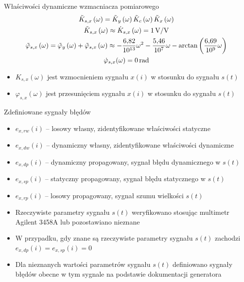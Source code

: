 \documentclass[12pt, polish, aspectratio = 169]{beamer}
\begin{document}
\begin{frame}{Właściwości dynamiczne wzmacniacza pomiarowego}
\begin{gather}
\tilde{K}_{s,x} \left(\omega\right) = \tilde{K}_{y} \left(\omega\right) \tilde{K}_{c} \left(\omega\right) \tilde{K}_{x} \left(\omega\right) \label{eq:pom_dwtin_amp} \\
\tilde{K}_{s,x} \left(\omega\right) \approx \dot{K}_{s,x} \left(\omega\right) = \qty{1}{V \per V} \label{eq:pom_dwtin_ampideal} \\
\tilde{\varphi}_{s,x} \left(\omega\right) = \tilde{\varphi}_{y} \left(\omega\right) + \tilde{\varphi}_{s,x} \left(\omega\right) \approx -\frac{\num{6.82}}{\num{e13}} \omega^{2} - \frac{\num{5.46}}{\num{e07}} \omega - \arctan \left(\frac{\num{6.69}}{\num{e9}} \omega\right) \label{eq:pom_dwtin_phi} \\
\dot{\varphi}_{s,x}(\omega) = \qty{0}{rad} \label{eq:pom_dwtin_phiideal}
\end{gather}
\begin{itemize}
\item $K_{s,x}(\omega)$ jest wzmocnieniem sygnału $x(i)$ w stosunku do sygnału $s(t)$
\item $\varphi_{s,x}(\omega)$ jest przesunięciem sygnału $x(i)$ w stosunku do sygnału $s(t)$
\end{itemize}
\end{frame}

\begin{frame}{Zdefiniowane sygnały błędów}
\begin{itemize}
\item $e_{x,rw}(i)$ -- losowy własny, zidentyfikowane właściwości statyczne
\item $e_{x,dw}(i)$ -- dynamiczny własny, zidentyfikowane właściwości dynamiczne
\item $e_{x,dp}(i)$ -- dynamiczny propagowany, sygnał błędu dynamicznego w $s(t)$
\item $e_{x,sp}(i)$ -- statyczny propagowany, sygnał błędu statycznego w $s(t)$
\item $e_{x,rp}(i)$ -- losowy propagowany, sygnał szumu wielkości $s(t)$
\end{itemize}
\begin{itemize}
\item Rzeczywiste parametry sygnału $s(t)$ weryfikowano stosując multimetr Agilent 3458A lub pozostawiano nieznane
\item W przypadku, gdy znane są rzeczywiste parametry sygnału $s(t)$ zachodzi $e_{x,dp}(i) = e_{x,sp}(i) = 0$
\item Dla nieznanych wartości parametrów sygnału $s(t)$ definiowano sygnały błędów obecne w tym sygnale na podstawie dokumentacji generatora
\end{itemize}
\end{frame}
\end{document}
